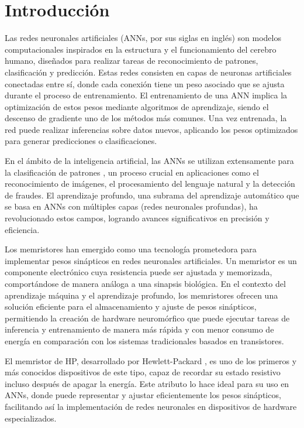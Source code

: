 \documentclass[conference]{IEEEtran}
\begin{document}
\section{Introducción}
Las redes neuronales artificiales (ANNs, por sus siglas en inglés) son modelos computacionales inspirados en la estructura y el funcionamiento del cerebro humano, diseñados para realizar tareas de reconocimiento de patrones, clasificación y predicción. Estas redes consisten en capas de neuronas artificiales conectadas entre sí, donde cada conexión tiene un peso asociado que se ajusta durante el proceso de entrenamiento. \cite{mem1} El entrenamiento de una ANN implica la optimización de estos pesos mediante algoritmos de aprendizaje, siendo el descenso de gradiente uno de los métodos más comunes. Una vez entrenada, la red puede realizar inferencias sobre datos nuevos, aplicando los pesos optimizados para generar predicciones o clasificaciones. \cite{mem2}

En el ámbito de la inteligencia artificial, las ANNs se utilizan extensamente para la clasificación de patrones \cite{mem3} \cite{mem4}, un proceso crucial en aplicaciones como el reconocimiento de imágenes, el procesamiento del lenguaje natural y la detección de fraudes. El aprendizaje profundo, una subrama del aprendizaje automático que se basa en ANNs con múltiples capas (redes neuronales profundas), ha revolucionado estos campos, logrando avances significativos en precisión y eficiencia.

Los memristores han emergido como una tecnología prometedora para implementar pesos sinápticos en redes neuronales artificiales. Un memristor es un componente electrónico cuya resistencia puede ser ajustada y memorizada, comportándose de manera análoga a una sinapsis biológica. \cite{mem5} En el contexto del aprendizaje máquina y el aprendizaje profundo, los memristores ofrecen una solución eficiente para el almacenamiento y ajuste de pesos sinápticos, permitiendo la creación de hardware neuromórfico que puede ejecutar tareas de inferencia y entrenamiento de manera más rápida y con menor consumo de energía en comparación con los sistemas tradicionales basados en transistores. \cite{mem6}

El memristor de HP, desarrollado por Hewlett-Packard \cite{HP}, es uno de los primeros y más conocidos dispositivos de este tipo, capaz de recordar su estado resistivo incluso después de apagar la energía. Este atributo lo hace ideal para su uso en ANNs, donde puede representar y ajustar eficientemente los pesos sinápticos, facilitando así la implementación de redes neuronales en dispositivos de hardware especializados. 
\end{document}
